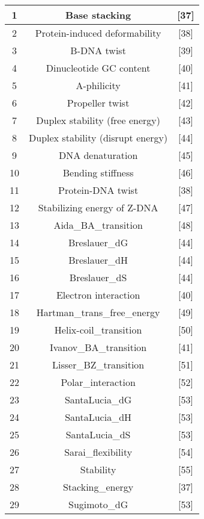 \begin{footnotesize}
\begin{longtable}{ccc}
        1 & Base stacking	& [37] \\\midrule
        2 & Protein-induced deformability	& [38] \\\midrule
        3 & B-DNA twist	& [39] \\\midrule
        4 & Dinucleotide GC content	& [40] \\\midrule
        5 & A-philicity	& [41] \\\midrule
        6 & Propeller twist	& [42] \\\midrule
        7 & Duplex stability (free energy)	& [43] \\\midrule
        8 & Duplex stability (disrupt energy)	& [44] \\\midrule
        9 & DNA denaturation	& [45] \\\midrule
        10 & Bending stiffness	& [46] \\\midrule
        11 & Protein-DNA twist	& [38] \\\midrule
        12 & Stabilizing energy of Z-DNA	& [47] \\\midrule
        13 & Aida\_BA\_transition	& [48] \\\midrule
        14 & Breslauer\_dG	& [44] \\\midrule
        15 & Breslauer\_dH	& [44] \\\midrule
        16 & Breslauer\_dS	& [44] \\\midrule
        17 & Electron interaction	& [40] \\\midrule
        18 & Hartman\_trans\_free\_energy	& [49] \\\midrule
        19 & Helix-coil\_transition	& [50] \\\midrule
        20 & Ivanov\_BA\_transition	& [41] \\\midrule
        21 & Lisser\_BZ\_transition	& [51] \\\midrule
        22 & Polar\_interaction	& [52] \\\midrule
        23 & SantaLucia\_dG	& [53] \\\midrule
        24 & SantaLucia\_dH	& [53] \\\midrule
        25 & SantaLucia\_dS	& [53] \\\midrule
        26 & Sarai\_flexibility	& [54] \\\midrule
        27 & Stability	& [55] \\\midrule
        28 & Stacking\_energy	& [37] \\\midrule
        29 & Sugimoto\_dG	& [53] \\\midrule

\end{longtable}
\end{footnotesize}
